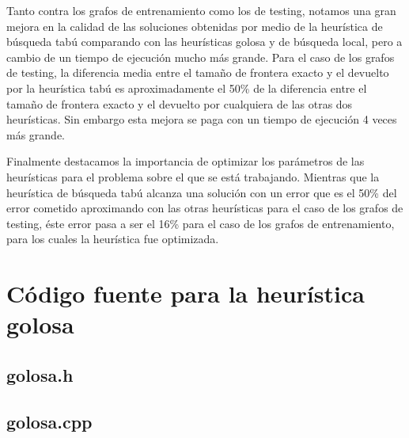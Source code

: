 \documentclass[a4paper, 10pt, twoside]{article}
\begin{document}
Tanto contra los grafos de entrenamiento como los de testing, notamos una gran mejora en la calidad de las soluciones obtenidas por medio de la heurística de búsqueda tabú comparando con las heurísticas golosa y de búsqueda local, pero a cambio de un tiempo de ejecución mucho más grande. Para el caso de los grafos de testing, la diferencia media entre el tamaño de frontera exacto y el devuelto por la heurística tabú es aproximadamente el 50\% de la diferencia entre el tamaño de frontera exacto y el devuelto por cualquiera de las otras dos heurísticas. Sin embargo esta mejora se paga con un tiempo de ejecución 4 veces más grande.

Finalmente destacamos la importancia de optimizar los parámetros de las heurísticas para el problema sobre el que se está trabajando. Mientras que la heurística de búsqueda tabú alcanza una solución con un error que es el 50\% del error cometido aproximando con las otras heurísticas para el caso de los grafos de testing, éste error pasa a ser el 16\% para el caso de los grafos de entrenamiento, para los cuales la heurística fue optimizada. 






\newpage

\section{Código fuente para la heurística golosa}


\subsection{golosa.h}




\subsection{golosa.cpp}




\end{document}
